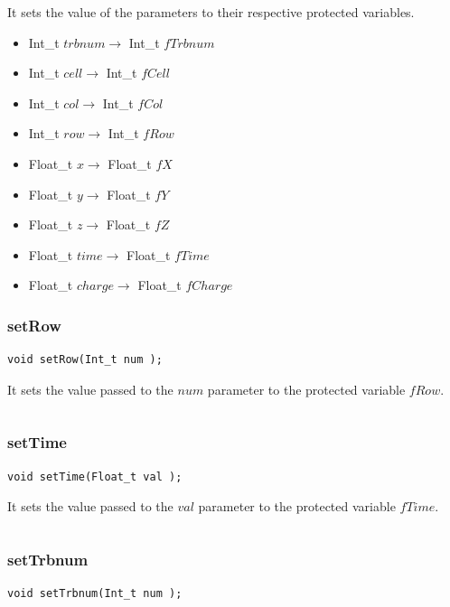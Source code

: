 \documentclass[a4paper]{book}
\begin{document}
It sets the value of the parameters to their respective protected variables.

\begin{itemize}
	\item Int\_t $trbnum \rightarrow$ Int\_t $fTrbnum$
	\item Int\_t $cell \rightarrow$ Int\_t $fCell$
	\item Int\_t $col \rightarrow$ Int\_t $fCol$
	\item Int\_t $row \rightarrow$ Int\_t $fRow$
	\item Float\_t $x \rightarrow$ Float\_t $fX$
	\item Float\_t $y \rightarrow$ Float\_t $fY$
	\item Float\_t $z \rightarrow$ Float\_t $fZ$
	\item Float\_t $time \rightarrow$ Float\_t $fTime$
	\item Float\_t $charge \rightarrow$ Float\_t $fCharge$
\end{itemize}

\subsubsection{setRow}

\begin{lstlisting}[style=customc]
void setRow(Int_t num );
\end{lstlisting}

It sets the value passed to the $num$ parameter to the protected variable $fRow$.

\[\]

\subsubsection{setTime}

\begin{lstlisting}[style=customc]
void setTime(Float_t val );
\end{lstlisting}

It sets the value passed to the $val$ parameter to the protected variable $fTime$.

\[\]

\subsubsection{setTrbnum}

\begin{lstlisting}[style=customc]
void setTrbnum(Int_t num );
\end{lstlisting}
\end{document}
